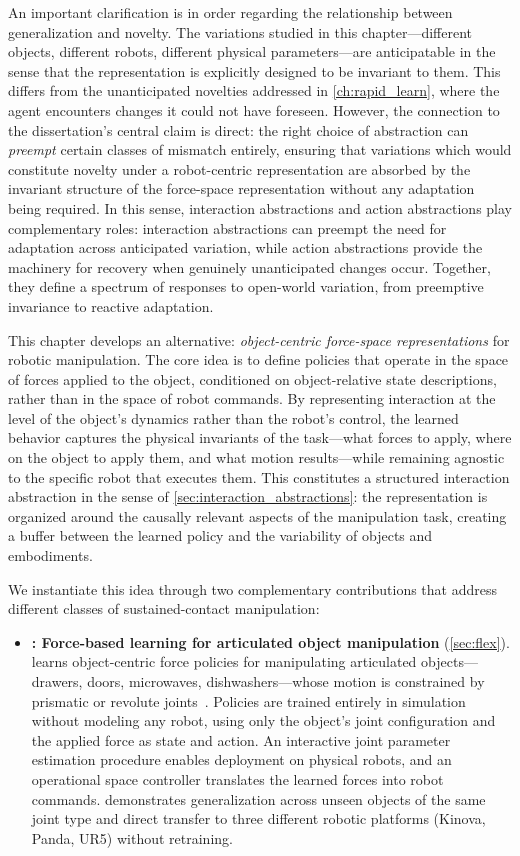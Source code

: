 {An important clarification is in order regarding the relationship between generalization and novelty. The variations studied in this chapter---different objects, different robots, different physical parameters---are anticipatable in the sense that the representation is explicitly designed to be invariant to them. This differs from the unanticipated novelties addressed in \cref{ch:rapid_learn}, where the agent encounters changes it could not have foreseen. However, the connection to the dissertation's central claim is direct: the right choice of abstraction can \emph{preempt} certain classes of mismatch entirely, ensuring that variations which would constitute novelty under a robot-centric representation are absorbed by the invariant structure of the force-space representation without any adaptation being required. In this sense, interaction abstractions and action abstractions play complementary roles: interaction abstractions can preempt the need for adaptation across anticipated variation, while action abstractions provide the machinery for recovery when genuinely unanticipated changes occur. Together, they define a spectrum of responses to open-world variation, from preemptive invariance to reactive adaptation.

This chapter develops an alternative: \emph{object-centric force-space representations} for robotic manipulation. The core idea is to define policies that operate in the space of forces applied to the object, conditioned on object-relative state descriptions, rather than in the space of robot commands. By representing interaction at the level of the object's dynamics rather than the robot's control, the learned behavior captures the physical invariants of the task---what forces to apply, where on the object to apply them, and what motion results---while remaining agnostic to the specific robot that executes them. This constitutes a structured interaction abstraction in the sense of \cref{sec:interaction_abstractions}: the representation is organized around the causally relevant aspects of the manipulation task, creating a buffer between the learned policy and the variability of objects and embodiments.

We instantiate this idea through two complementary contributions that address different classes of sustained-contact manipulation:

\begin{itemize}[leftmargin=*]
\item \textbf{\FLEX{}: Force-based learning for articulated object manipulation} (\cref{sec:flex}). \FLEX{} learns object-centric force policies for manipulating articulated objects---drawers, doors, microwaves, dishwashers---whose motion is constrained by prismatic or revolute joints~\citep{fang2025flex}. Policies are trained entirely in simulation without modeling any robot, using only the object's joint configuration and the applied force as state and action. An interactive joint parameter estimation procedure enables deployment on physical robots, and an operational space controller translates the learned forces into robot commands. \FLEX{} demonstrates generalization across unseen objects of the same joint type and direct transfer to three different robotic platforms (Kinova, Panda, UR5) without retraining.


\end{itemize}}
